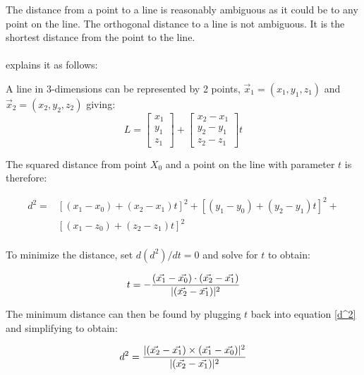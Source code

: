 	\label{DistanceOfPointToLine}
	The distance from a point to a line is reasonably ambiguous as it could be to any point on the line. The orthogonal distance to a line is not ambiguous. It is the shortest distance from the point to the line.\\
	\\
	\noindent\cite{weisstein_point-line_????} explains it as follows:
	
	A line in 3-dimensions can be represented by 2 points, $\vec{x}_1 = (x_1,y_1,z_1)$ and $\vec{x}_2 = (x_2,y_2,z_2)$ giving:\\
	
	\begin{equation}\label{LineEqn}
	L = \begin{bmatrix}
	x_1 \\
	y_1\\
	z_1 
	\end{bmatrix} + \begin{bmatrix}
	x_2 - x_1 \\
	y_2 - y_1\\
	z_2 - z_1
	\end{bmatrix}t
	\end{equation}
	
	\noindent The squared distance from point $X_0$ and a point on the line with parameter $t$ is therefore:
	
	\begin{equation}\label{d^2}
	\begin{split}
	d^2 = &[(x_1 - x_0) + (x_2 - x_1)t]^2 + [(y_1 - y_0) + (y_2 - y_1)t]^2  + \\
	  &[(x_1 - z_0) + (z_2 - z_1)t]^2 
	\end{split}
	\end{equation}\\

	\noindent To minimize the distance, set $d(d^2)/dt = 0$ and solve for $t$ to obtain:
	
	\begin{equation}\label{formT}
	t = - \frac{(\vec{x_1} - \vec{x_0}) \cdot (\vec{x_2} - \vec{x_1})  }{\lvert (\vec{x_2} - \vec{x_1}) \rvert^2}
	\end{equation}
	
	The minimum distance can then be found by plugging $t$ back into equation \ref{d^2} and simplifying to obtain:
	
	\begin{equation}
	d^2 = \frac{ \lvert  (\vec{x_2} - \vec{x_1}) \times (\vec{x_1} - \vec{x_0}) \rvert^2  }{\lvert (\vec{x_2} - \vec{x_1}) \rvert^2}
	\end{equation}
	
